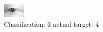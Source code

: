 \begin{figure}[h!]
\begin{center}
\includegraphics[width=0.60\columnwidth]{figures/ID2689_class_3_target_4.png}
\end{center}
\caption{ Classification: 3 actual target: 4}
\label{fig:ID2689_class_3_target_4}
\end{figure}
